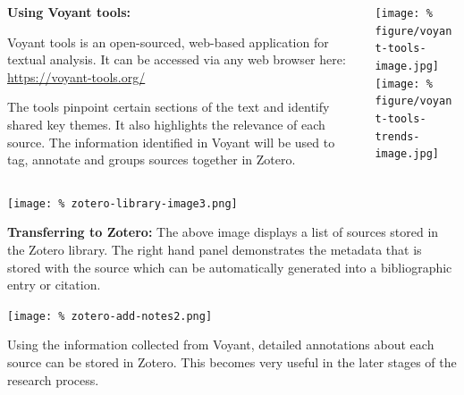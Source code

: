 \documentclass[unknownkeysallowed,usepdftitle=false, aspectratio=169, parskip=full]{beamer}
\newcommand{\secvariable}{nothing}
\newcommand{\mysection}[1]{\renewcommand{\secvariable}{#1}
}
\begin{document}
\begin{frame}\label{\secvariable}
  \begin{columns}[t]
    \begin{column}[c]{0.50\textwidth}
    \parbox{\linewidth}{

\textbf{Using Voyant tools:}

 Voyant tools is an open-sourced, web-based application for textual analysis. It can be accessed via any web browser here: \url{https://voyant-tools.org/}   
      \vspace{8pt}
      
The tools  pinpoint certain sections of the text and identify shared key themes. It also highlights the relevance of each source. The information identified in Voyant will be used to tag, annotate and groups sources together in Zotero. 	
      }
    \end{column}
    \begin{column}[c]{0.45\textwidth}
\texttt{[image: \%
figure/voyant-tools-image.jpg]}\\
\vspace{12pt}
\texttt{[image: \%
figure/voyant-tools-trends-image.jpg]}
    \end{column}
  \end{columns}

  
\end{frame}

\mysection{line}
\begin{frame}\label{\secvariable}
\begin{center}
  \vspace{-0.5cm}
 \texttt{[image: \%
  zotero-library-image3.png]}
\end{center}
  \vspace{-0.5cm}
   \textbf{Transferring to Zotero:} The above image displays a list of sources stored in the Zotero library. The right hand panel demonstrates the metadata that is stored with the source which can be automatically generated into a bibliographic entry or citation.    
\end{frame}

\mysection{major}
\begin{frame}\label{\secvariable} %
\begin{center}
\texttt{[image: \%
zotero-add-notes2.png]}
\end{center}

    \parbox{\linewidth}{
Using the information collected from Voyant, detailed annotations about each source can be stored in Zotero. This becomes very useful in the later stages of the research process. 
}
\end{frame}
\end{document}
